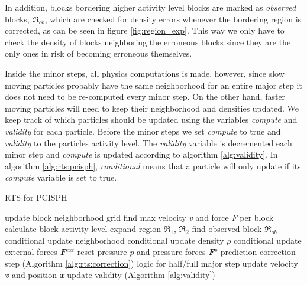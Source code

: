 \documentclass[../../main.tex]{subfiles}
\begin{document}
In addition, blocks bordering higher activity level blocks are marked as \textit{observed} blocks, $\Re_{ob}$, which are checked for density errors whenever the bordering region is corrected, as can be seen in figure \ref{fig:region_exp}. This way we only have to check the density of blocks neighboring the erroneous blocks since they are the only ones in risk of becoming erroneous themselves. 

Inside the minor steps, all physics computations is made, however, since slow moving particles probably have the same neighborhood for an entire major step it does not need to be re-computed every minor step. On the other hand, faster moving particles will need to keep their neighborhood and densities updated. We keep track of which particles should be updated using the variables \textit{compute} and \textit{validity} for each particle. Before the minor steps we set \textit{compute} to true and \textit{validity} to the particles activity level. The \textit{validity} variable is decremented each minor step and \textit{compute} is updated according to algorithm \ref{alg:validity}. In algorithm \ref{alg:rts:pcisph}, \textit{conditional} means that a particle will only update if its \textit{compute} variable is set to true. 

\begin{algorithm}[]
    \caption{RTS for PCISPH}
    \label{alg:rts:pcisph}
    \begin{algorithmic}[1]
            \State update block neighborhood grid
            \State find max velocity \textit{v} and force \textit{F} per block
            \State calculate block activity level
            \State expand region $\Re_1$, $\Re_2$
            \State find observed block $\Re_{ob}$
                \State conditional update neighborhood
                \State conditional update density $\rho$
                \State conditional update external forces \textbf{\textit{F}}$^{ext}$
                \State reset pressure \textit{p} and pressure forces \textbf{\textit{F}}$^p$
                \State prediction correction step (Algorithm \ref{alg:rts:correction})
                \State logic for half/full major step
                \State update velocity \textbf{\textit{v}} and position \textbf{\textit{x}}
                \State update validity (Algorithm \ref{alg:validity})
            \EndFor
        \EndWhile
   \end{algorithmic}
\end{algorithm}
\end{document}
